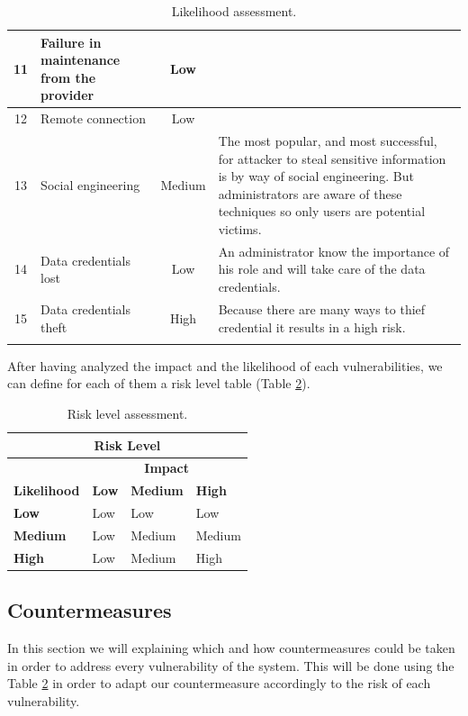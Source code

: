 \documentclass[a4paper,10pt]{article}
\begin{document}
\begin{longtable}{|c|p{}|c|p{10cm}|}
\hline
11 & Failure in maintenance from the provider & Low  & \\
\hline
12 & Remote connection & Low & \\
\hline
13 & Social engineering  & Medium & The most popular, and most successful, for attacker to steal sensitive information is by way of social engineering. But administrators are aware of these techniques so only users are potential victims. \\
\hline
14 & Data credentials lost & Low & An administrator know the importance of his role and will take care of the data credentials. \\
\hline
15 &  Data credentials theft&  High & Because there are many ways to thief credential it results in a high risk. \\
\hline
\caption{Likelihood assessment.}
\label{tab:likelihood}
\end{longtable}

After having analyzed the impact and the likelihood of each vulnerabilities, we can define for each of them a risk level table (Table \ref{tab:risk}).

\begin{table}[!h]
	\centering
	\begin{tabular}{|l|l|l|l|}
		\hline
		\multicolumn{4}{|c|}{\textbf{Risk Level}} \\
		\hline
		 & \multicolumn{3}{|c|}{\textbf{Impact}}  \\ \hline
		\textbf{Likelihood} & \textbf{Low} & \textbf{Medium} & \textbf{High} \\ \hline
		\textbf{Low}& Low & Low & Low \\ \hline
		\textbf{Medium} & Low & Medium & Medium \\ \hline
		\textbf{High} & Low & Medium & High \\ \hline
	\end{tabular}
	\caption{Risk level assessment.}
	\label{tab:risk}
\end{table} 



\subsection{Countermeasures}
In this section we will explaining which and how countermeasures could be taken in order to address every vulnerability of the system. This will be done using the Table \ref{tab:risk} in order to adapt our countermeasure accordingly to the risk of each vulnerability.
\end{document}
